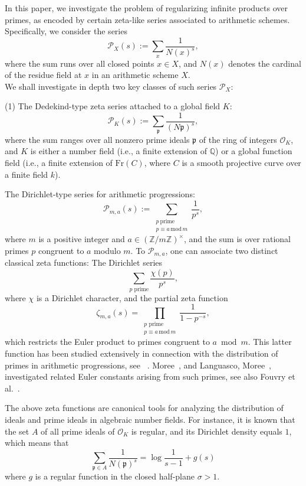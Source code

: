 \documentclass[12pt]{amsart}
\begin{document}
In this paper, we investigate the problem of regularizing infinite products over primes, as encoded by certain zeta-like series associated to  {arithmetic}  schemes. Specifically, we consider the series
\[
\mathcal{P}_X(s) := \sum_{x} \frac{1}{N(x)^s},
\]
where the sum runs over all closed points $x \in X$, and $N(x)$ denotes the cardinal  of the residue field at $x$ in an  {arithmetic}  scheme $X$.\\


We shall investigate in  depth two key classes of such series $\mathcal{P}_X$:




\smallskip
\noindent(1) The Dedekind-type zeta series attached to a global field $K$:
\[
\mathcal{P}_K(s) := \sum_{\mathfrak{p}} \frac{1}{(N\mathfrak{p})^s},
\]
where the sum ranges over all nonzero prime ideals $\mathfrak{p}$ of the ring of integers $\mathcal{O}_K$, and $K$ is either a number field (i.e., a finite extension of $\mathbb{Q}$) or a global function field (i.e., a finite extension of $\mathrm{Fr}(C)$, where $C$ is a smooth projective curve over a finite field $k$).


\smallskip


 The Dirichlet-type series for  {arithmetic}  progressions:
\[
\mathcal{P}_{m,a}(s) := \sum_{\substack{p\ \text{prime} \\ p \equiv a\, \mathrm{mod}\, m}} \frac{1}{p^s},
\]
where $m$ is a positive integer and $a \in (\mathbb{Z}/m\mathbb{Z})^\times$, and the sum is over rational primes $p$ congruent to $a$ modulo $m$.  To $\mathcal{P}_{m,a}$, one can associate two distinct classical zeta functions: The Dirichlet series  
\[
\sum_{p \text{ prime}} \frac{\chi(p)}{p^s},
\]  
where $\chi$ is a Dirichlet character, and the partial zeta function  
\[
\zeta_{m,a}(s) = \prod_{\substack{p \text{ prime} \\ p \equiv a\, \mathrm{mod}\, m}} \frac{1}{1 - p^{-s}},
\label{eq:zeta_da}
\]  
which restricts the Euler product to primes congruent to $a \bmod m$.   This latter function has been studied extensively in connection with the distribution of primes in  {arithmetic}  progressions,  see ~\cite{Landau-1,Landau-2}.  Moree~\cite{Moree-2}, and Languasco, Moree~\cite{Moree-1}, investigated related Euler constants arising from such primes, see also Fouvry et al.~\cite{Waldschmidt-1}.



The above zeta functions are canonical tools for analyzing the distribution of ideals and prime ideals in algebraic number fields.  For instance, it is known that the set $A$ of all prime ideals of $\mathcal O_K$ is regular, and its Dirichlet density equals $1$, which means that 
\[
\sum_{\mathfrak{p} \in A} \frac{1}{N(\mathfrak{p})^s} =  \log \frac{1}{s - 1} + g(s)
\]
where $g$ is a regular function in the closed half-plane $\sigma>1$.\\
\end{document}
